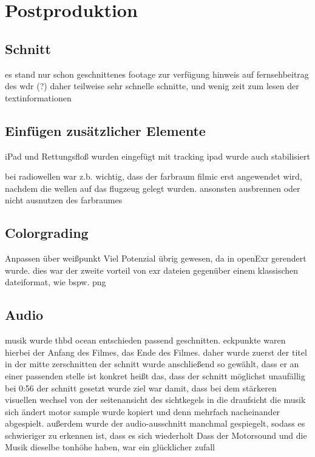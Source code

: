 \chapter{Postproduktion}

\section{Schnitt}

es stand nur schon geschnittenes footage zur verfügung
hinweis auf fernsehbeitrag des wdr (?)
daher teilweise sehr schnelle schnitte, und wenig zeit zum lesen der textinformationen

\section{Einfügen zusätzlicher Elemente}

iPad und Rettungsfloß wurden eingefügt mit tracking
ipad wurde auch stabilisiert

bei radiowellen war z.b. wichtig, dass der farbraum filmic erst angewendet wird, nachdem die wellen auf das flugzeug gelegt wurden. ansonsten ausbrennen oder nicht ausnutzen des farbraumes


\section{Colorgrading}

Anpassen über weißpunkt
Viel Potenzial übrig gewesen, da in openExr gerendert wurde.
dies war der zweite vorteil von exr dateien gegenüber einem klassischen dateiformat, wie bspw. png

\section{Audio}

musik wurde thbd ocean entschieden
passend geschnitten. eckpunkte waren hierbei der Anfang des Filmes, das Ende des Filmes.
daher wurde zuerst der titel in der mitte zerschnitten
der schnitt wurde anschließend so gewählt, dass er an einer passenden stelle ist
konkret heißt das, dass der schnitt möglichst unaufällig bei 0:56 der schnitt gesetzt wurde
ziel war damit, dass bei dem stärkeren visuellen wechsel von der seitenansicht des sichtkegels in die draufsicht die musik sich ändert
motor sample wurde kopiert und denn mehrfach nacheinander abgespielt. außerdem wurde der audio-ausschnitt manchmal gespiegelt, sodass es schwieriger zu erkennen ist, dass es sich wiederholt
Dass der Motorsound und die Musik dieselbe tonhöhe haben, war ein glücklicher zufall